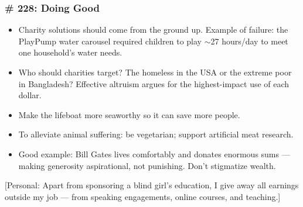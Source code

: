 \begin{frame}[fragile]
\frametitle{\# 228: Doing Good}

\begin{itemize}
\item Charity solutions should come from the ground up. Example of failure: the PlayPump water carousel required children to play $\sim$27 hours/day to meet one household's water needs.
\item Who should charities target? The homeless in the USA or the extreme poor in Bangladesh? Effective altruism argues for the highest-impact use of each dollar.
\item Make the lifeboat more seaworthy so it can save more people.
\item To alleviate animal suffering: be vegetarian; support artificial meat research.
\item Good example: Bill Gates lives comfortably and donates enormous sums --- making generosity aspirational, not punishing. Don't stigmatize wealth.
\end{itemize}

[Personal: Apart from sponsoring a blind girl's education, I give away all earnings outside my job --- from speaking engagements, online courses, and teaching.]
\end{frame}
